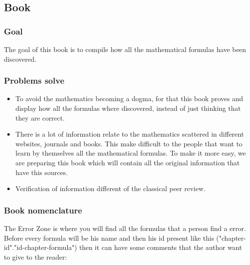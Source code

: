 \documentclass{book}
\begin{document}
            \subsection{Book}
                \subsubsection{Goal}
                    The goal of this book is to compile how all the mathematical formulas have been discovered.

                \subsubsection{Problems solve}
                    \begin{itemize}
                        \item To avoid the mathematics becoming a dogma, for that this book proves and display how all the formulas where discovered, instead of just thinking that they are correct.

                        \item There is a lot of information relate to the mathematics scattered in different websites, journals and books. This make difficult to the people that want to learn by themselves all the mathematical formulas. To make it more easy, we are preparing this book which will contain all the original information that have this sources.

                        \item Verification of information different of the classical peer review.
                    \end{itemize}
    
                \subsubsection{Book nomenclature}
                    The Error Zone is where you will find all the formulas that a person find a error. \\
    
                    Before every formula will be his name and then his id present like this ("chapter-id"."id-chapter-formula") then it can have some comments that the author want to give to the reader: \\
    
\end{document}
